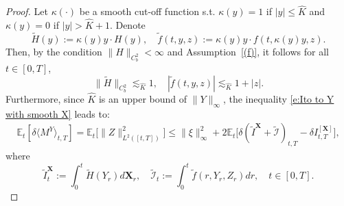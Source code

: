 \documentclass[11pt,reqno]{amsart}
\numberwithin{equation}{section}
\def\E{\mathbb E}
\begin{document}
\begin{proof}
Let $\kappa (\bm\cdot)$ be a smooth cut-off function s.t. $\kappa(y) = 1$ if $|y| \le \hat K$ and $\kappa(y) = 0$ if $|y| > \hat K + 1$. Denote 
\begin{equation*}
\tilde{H}(y) := \kappa(y) y\cdot  H(y),\quad \tilde{f}(t,y,z) := \kappa(y)y \cdot f(t,\kappa(y)y,z).
\end{equation*}
Then, by the condition $\|H\|_{C^{2}_{b}}<\infty$ and Assumption~\ref{(f)}, it follows for all $t\in[0,T]$, 
\begin{equation}\label{e:for tilde f}
\|\tilde{H}\|_{C^{2}_{b}}\lesssim_{\hat K} 1, \quad |\tilde{f}(t,y,z)| \lesssim_{\hat K} 1 + |z|.
\end{equation}
Furthermore, since $\hat K$ is an upper bound of $\|Y\|_{\infty}$, the inequality \eqref{e:Ito to Y with smooth X} leads to:
\begin{equation}\label{e:Ito to Y with smooth X'}
\begin{aligned}
\E_{t}\left[\delta \langle M^{Y} \rangle_{t,T}\right] = \E_{t}\Big[\|Z\|^2_{L^{2}([t,T])}\Big] \le \|\xi \|^{2}_{\infty} + 2\E_{t} \Big[ \delta (\tilde{I}^{\mathbf X} + \tilde{\mathcal I})_{t,T} - \delta 
I^{[\mathbf X]}_{t,T} \Big],
\end{aligned}
\end{equation}
where 
\begin{equation*}
\tilde{I}^{\mathbf X}_{t} := \int_{0}^{t} \tilde{H}(Y_{r})d\mathbf X_{r},\quad \tilde{\mathcal I}_{t} := \int_{0}^{t} \tilde{f}
(r,Y_r,Z_r) dr,\quad t\in[0,T].
\end{equation*}


\end{proof}
\end{document}
